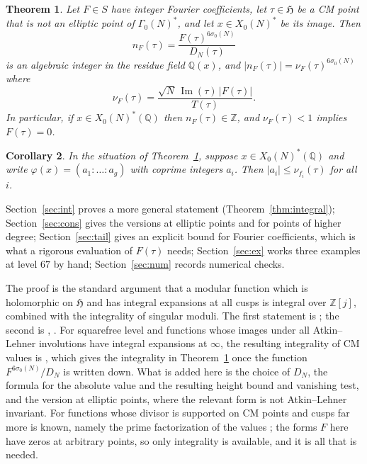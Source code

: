 \documentclass[11pt]{amsart}
\newtheorem{theorem}{Theorem}[section]
\newtheorem{corollary}[theorem]{Corollary}
\theoremstyle{definition}
\theoremstyle{remark}
\newcommand{\Z}{\mathbb{Z}}
\newcommand{\Q}{\mathbb{Q}}
\newcommand{\HH}{\mathfrak{H}}
\newcommand{\im}{\operatorname{Im}}
\newcommand{\sz}{\sigma_0}
\newcommand{\Xs}{X_0(N)^*}
\newcommand{\Gs}{\Gamma_0(N)^*}
\begin{document}
\begin{theorem}\label{thm:main-intro}
Let $F\in S$ have integer Fourier coefficients, let $\tau\in\HH$ be a CM point
that is not an elliptic point of $\Gs$, and let $x\in\Xs$ be its image.  Then
\[
n_F(\tau)=\frac{F(\tau)^{6\sz(N)}}{D_N(\tau)}
\]
is an algebraic integer in the residue field $\Q(x)$, and
$\lvert n_F(\tau)\rvert=\nu_F(\tau)^{6\sz(N)}$ where
\[
\nu_F(\tau)=\frac{\sqrt N\,\im(\tau)\,\lvert F(\tau)\rvert}{T(\tau)} .
\]
In particular, if $x\in\Xs(\Q)$ then $n_F(\tau)\in\Z$, and
$\nu_F(\tau)<1$ implies $F(\tau)=0$.
\end{theorem}

\begin{corollary}\label{cor:height-intro}
In the situation of Theorem~\ref{thm:main-intro}, suppose $x\in\Xs(\Q)$ and write
$\varphi(x)=(a_1:\dots:a_g)$ with coprime integers $a_i$.  Then
$\lvert a_i\rvert\le\nu_{f_i}(\tau)$ for all $i$.
\end{corollary}

Section~\ref{sec:int} proves a more general statement
(Theorem~\ref{thm:integral}); Section~\ref{sec:cons} gives the versions at
elliptic points and for points of higher degree; Section~\ref{sec:tail} gives an
explicit bound for Fourier coefficients, which is what a rigorous evaluation of
$F(\tau)$ needs; Section~\ref{sec:ex} works three examples at level $67$ by
hand; Section~\ref{sec:num} records numerical checks.

The proof is the standard argument that a modular function which is holomorphic
on $\HH$ and has integral expansions at all cusps is integral over $\Z[j]$,
combined with the integrality of singular moduli.  The first statement is
\cite[Ch.~2, \S2, Lemma~2.1]{KubertLang}; the second is
\cite[Ch.~5, \S2, Thm.~4]{Lang}, \cite[Thm.~11.1]{Cox}.  For squarefree level
and functions whose images under all Atkin--Lehner involutions have integral
expansions at $\infty$, the resulting integrality of CM values is
\cite[Lemmas~4.3 and~4.4]{BruinierOno}, which gives the integrality in
Theorem~\ref{thm:main-intro} once the function $F^{6\sz(N)}/D_N$ is written
down.  What is added here is the choice of $D_N$, the formula for the absolute
value and the resulting height bound and vanishing test, and the version at
elliptic points, where the relevant form is not Atkin--Lehner invariant.  For
functions whose divisor
is supported on CM points and cusps far more is known, namely the prime
factorization of the values \cite{GrossZagier}; the forms $F$ here have zeros at
arbitrary points, so only integrality is available, and it is all that is needed.
\end{document}
